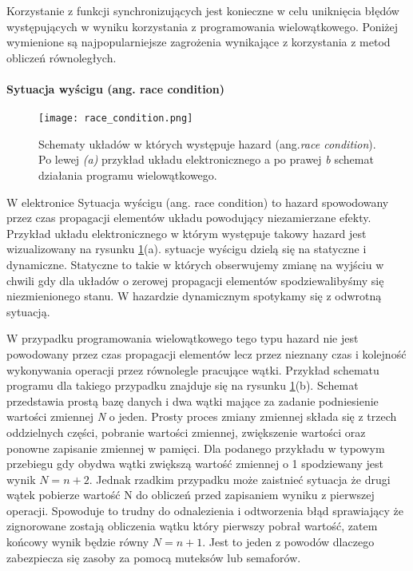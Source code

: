 Korzystanie z funkcji synchronizujących jest konieczne w celu uniknięcia błędów występujących w wyniku korzystania z programowania wielowątkowego. Poniżej wymienione są najpopularniejsze zagrożenia  wynikające z korzystania z metod obliczeń równoległych. 

\paragraph{Sytuacja wyścigu (ang. race condition)}

\begin{figure}[t]
        \centering
        \texttt{[image: race\_condition.png]}
        \caption{Schematy układów w których występuje hazard (ang.\textit{race condition}). Po lewej \textit{(a)} przykład układu elektronicznego a po prawej \textit{{b}} schemat działania programu wielowątkowego. }
        \label{race condition}
\end{figure}

W elektronice Sytuacja wyścigu (ang. race condition) to hazard spowodowany przez czas propagacji elementów układu powodujący niezamierzane efekty. Przykład układu elektronicznego w którym występuje takowy hazard jest wizualizowany na rysunku \ref{race condition}(a). 
sytuacje wyścigu dzielą się na statyczne i dynamiczne. Statyczne to takie w których obserwujemy zmianę na wyjściu w chwili gdy dla układów o zerowej propagacji elementów spodziewalibyśmy się niezmienionego stanu.
W hazardzie dynamicznym spotykamy się z odwrotną sytuacją. 

W przypadku programowania wielowątkowego tego typu hazard nie jest powodowany przez czas propagacji elementów lecz przez nieznany czas i kolejność wykonywania operacji przez równolegle pracujące wątki. Przykład schematu programu dla takiego przypadku znajduje się na rysunku \ref{race condition}(b). Schemat przedstawia prostą bazę danych i dwa wątki mające za zadanie podniesienie wartości zmiennej \textit{N} o jeden.
Prosty proces zmiany zmiennej składa się z trzech oddzielnych części, pobranie wartości zmiennej, zwiększenie wartości oraz ponowne zapisanie zmiennej w pamięci. 
Dla podanego przykładu w typowym przebiegu gdy obydwa wątki zwiększą wartość zmiennej o 1 spodziewany jest wynik $N = n+2$. Jednak rzadkim przypadku może zaistnieć sytuacja że drugi wątek pobierze wartość N do obliczeń przed zapisaniem wyniku z pierwszej operacji. Spowoduje to trudny do odnalezienia i odtworzenia błąd sprawiający że zignorowane zostają obliczenia wątku który pierwszy pobrał wartość, zatem końcowy wynik będzie równy $N = n+1$.
Jest to jeden z powodów dlaczego zabezpiecza się zasoby za pomocą muteksów lub semaforów. 

